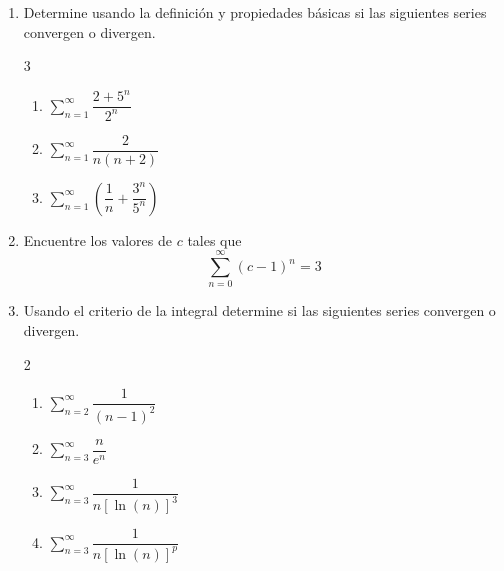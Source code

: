 \begin{frame}
  \begin{enumerate}
    \item Determine usando la definición y propiedades básicas si las siguientes series convergen o divergen.
    \begin{multicols}{3}
      \begin{enumerate}
        \item $\displaystyle\sum_{n=1}^{\infty}\dfrac{2+5^n}{2^n}$
        \item $\displaystyle\sum_{n=1}^{\infty}\dfrac{2}{n(n+2)}$
        \item $\displaystyle\sum_{n=1}^{\infty}\left(\dfrac{1}{n}+\dfrac{3^n}{5^n}\right)$
      \end{enumerate}
    \end{multicols}
    \item Encuentre los valores de $c$ tales que
    $$\sum_{n=0}^{\infty}(c-1)^n=3$$
    \item Usando el criterio de la integral determine si las siguientes series convergen o divergen.
    \begin{multicols}{2}
      \begin{enumerate}
        \item $\displaystyle\sum_{n=2}^{\infty}\dfrac{1}{(n-1)^2}$
        \item $\displaystyle\sum_{n=3}^{\infty}\dfrac{n}{e^n}$
        \item $\displaystyle\sum_{n=3}^{\infty}\dfrac{1}{n[\ln(n)]^3}$
        \item $\displaystyle\sum_{n=3}^{\infty}\dfrac{1}{n[\ln(n)]^p}$
      \end{enumerate}
    \end{multicols}
  \end{enumerate}
\end{frame}

